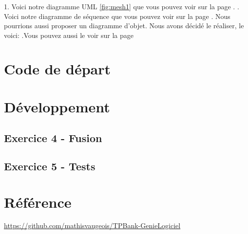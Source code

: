 \documentclass{article}
\begin{document}


1.
Voici notre diagramme UML \ref{fig:mesh1} que vous pouvez voir sur la page \pageref{fig:mesh1}.
. Voici notre diagramme de séquence %
 que vous pouvez voir sur la page%
. Nous pourrions aussi proposer un diagramme d'objet. Nous avons décidé le réaliser, le voici:
.Vous pouvez aussi le voir sur la page%


\newpage
\section{Code de départ}
\newpage
\section{Développement}
\subsection{Exercice 4 - Fusion}

\subsection{Exercice 5 - Tests}
\newpage
\section*{Référence}




\url{https://github.com/mathisvaugeois/TPBank-GenieLogiciel}
\end{document}
